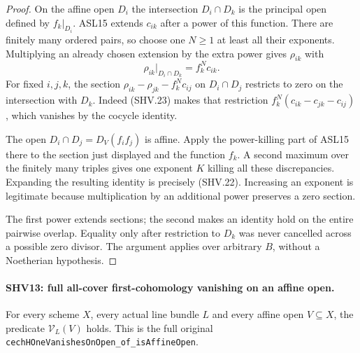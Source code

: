 \documentclass[11pt,a4paper]{article}
\numberwithin{equation}{section}
\theoremstyle{remark}\newtheorem{remark}[theorem]{Remark}
\begin{document}
\begin{proof}
On the affine open $D_i$ the intersection $D_i\cap D_k$
is the principal open defined by $f_k|_{D_i}$.
ASL15 extends $c_{ik}$ after a power of this function.
There are finitely many ordered pairs, so choose one $N\ge1$
at least all their exponents.  Multiplying an already chosen
extension by the extra power gives $\rho_{ik}$ with
\[
                  \rho_{ik}|_{D_i\cap D_k}=f_k^N c_{ik}.
                                                        \tag{SHV.23}
\]
For fixed $i,j,k$, the section
$\rho_{ik}-\rho_{jk}-f_k^N c_{ij}$ on $D_i\cap D_j$
restricts to zero on the intersection with $D_k$.
Indeed (SHV.23) makes that restriction
$f_k^N(c_{ik}-c_{jk}-c_{ij})$, which vanishes by the cocycle
identity.

The open $D_i\cap D_j=D_V(f_i f_j)$ is affine.  Apply the
power-killing part of ASL15 there to the section just displayed
and the function $f_k$.  A second maximum over the finitely many
triples gives one exponent $K$ killing all these discrepancies.
Expanding the resulting identity is precisely (SHV.22).
Increasing an exponent is legitimate because multiplication by
an additional power preserves a zero section.

The first power extends sections; the second makes an identity
hold on the entire pairwise overlap.  Equality only after
restriction to $D_k$ was never cancelled across a possible
zero divisor.  The argument applies over arbitrary $B$, without
a Noetherian hypothesis.
\end{proof}

\paragraph{SHV13: full all-cover first-cohomology vanishing on an affine open.}
\label{claim:SHV13}
For every scheme $X$, every actual line bundle $L$ and every
affine open $V\subseteq X$, the predicate $\mathcal V_L(V)$
holds.  This is the full original
\texttt{cech\allowbreak HOne\allowbreak Vanishes\allowbreak On\allowbreak Open\_\allowbreak of\_\allowbreak is\allowbreak Affine\allowbreak Open}.
\end{document}
